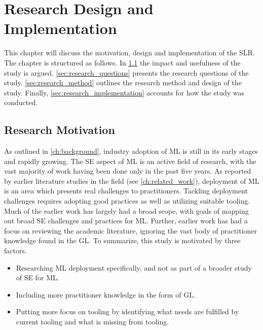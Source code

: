 \chapter{Research Design and Implementation}
\label{ch:research_design_and_implementation}
This chapter will discuss the motivation, design and implementation of the SLR.
The chapter is structured as follows.
In \cref{sec:research_motivation} the impact and usefulness of the study is argued.
\cref{sec:research_questions} presents the research questions of the study.
\cref{sec:research_method} outlines the research method and design of the study.
Finally, \cref{sec:research_implementation} accounts for how the study was conducted.

\section{Research Motivation}
\label{sec:research_motivation}
As outlined in \cref{ch:background}, industry adoption of ML is still in its early stages and rapidly growing.
The SE aspect of ML is an active field of research, with the vast majority of work having been done only in the past five years.
As reported by earlier literature studies in the field (see \cref{ch:related_work}), deployment of ML is an area which presents real challenges to practitioners.
Tackling deployment challenges requires adopting good practices as well as utilizing suitable tooling.
Much of the earlier work has largely had a broad scope, with goals of mapping out broad SE challenges and practices for ML.
Further, earlier work has had a focus on reviewing the academic literature, ignoring the vast body of practitioner knowledge found in the GL.
To summarize, this study is motivated by three factors.
\begin{itemize}
    \item Researching ML deployment specifically, and not as part of a broader study of SE for ML.
    \item Including more practitioner knowledge in the form of GL.
    \item Putting more focus on tooling by identifying what needs are fulfilled by current tooling and what is missing from tooling.
\end{itemize}

